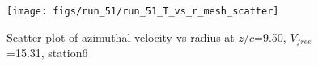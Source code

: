 \begin{figure}[H]
\centering
\texttt{[image: figs/run\_51/run\_51\_T\_vs\_r\_mesh\_scatter]}
\caption{Scatter plot of azimuthal velocity vs radius at $z/c$=9.50, $V_{free}$=15.31, station6}
\label{fig:run_51_T_vs_r_mesh_scatter}
\end{figure}



